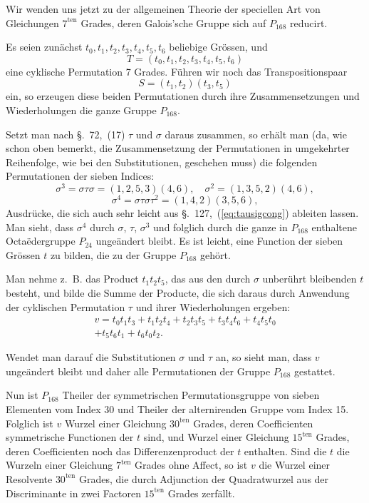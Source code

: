 \documentclass[12pt,a4paper]{article}
\begin{document}
Wir wenden uns jetzt zu der allgemeinen Theorie der speciellen Art von Gleichungen $7^{\text{ten}}$ Grades, deren Galois'sche Gruppe sich auf $P_{168}$ reducirt.

Es seien zun\"achst $t_0, t_1, t_2, t_3, t_4, t_5, t_6$ beliebige Gr\"ossen, und
\begin{equation}
\label{eq:Tperm} T = (t_0, t_1, t_2, t_3, t_4, t_5, t_6)
\end{equation}
eine cyklische Permutation 7 Grades. F\"uhren wir noch das Transpositionspaar
\begin{equation}
\label{eq:Sperm} S = (t_1, t_2)(t_3, t_5)
\end{equation}
ein, so erzeugen diese beiden Permutationen durch ihre Zusammensetzungen und Wiederholungen die ganze Gruppe $P_{168}$.

Setzt man nach \S.~72,~(17) $\tau$ und $\sigma$ daraus zusammen, so erh\"alt man (da, wie schon oben bemerkt, die Zusammensetzung der Permutationen in umgekehrter Reihenfolge, wie bei den Substitutionen, geschehen muss) die folgenden Permutationen der sieben Indices:
\[\sigma^3 = \sigma\tau\sigma = (1, 2, 5, 3)(4, 6), \quad \sigma^2 = (1, 3, 5, 2)(4, 6),\]
\[\sigma^4 = \sigma\tau\sigma\tau^2 = (1, 4, 2)(3, 5, 6),\]
Ausdr\"ucke, die sich auch sehr leicht aus \S.~127,~(\ref{eq:tausigcong}) ableiten lassen. Man sieht, dass $\sigma^4$ durch $\sigma$, $\tau$, $\sigma^3$ und folglich durch die ganze in $P_{168}$ enthaltene Octa\"edergruppe $P_{24}$ unge\"andert bleibt. Es ist leicht, eine Function der sieben Gr\"ossen $t$ zu bilden, die zu der Gruppe $P_{168}$ geh\"ort.

Man nehme z.~B. das Product $t_1 t_2 t_5$, das aus den durch $\sigma$ unber\"uhrt bleibenden $t$ besteht, und bilde die Summe der Producte, die sich daraus durch Anwendung der cyklischen Permutation $\tau$ und ihrer Wiederholungen ergeben:
\begin{multline}
\label{eq:v} v = t_0 t_1 t_3 + t_1 t_2 t_4 + t_2 t_3 t_5 + t_3 t_4 t_6 + t_4 t_5 t_0\\ + t_5 t_6 t_1 + t_6 t_0 t_2.
\end{multline}

Wendet man darauf die Substitutionen $\sigma$ und $\tau$ an, so sieht man, dass $v$ unge\"andert bleibt und daher alle Permutationen der Gruppe $P_{168}$ gestattet.

Nun ist $P_{168}$ Theiler der symmetrischen Permutationsgruppe von sieben Elementen vom Index 30 und Theiler der alternirenden Gruppe vom Index 15. Folglich ist $v$ Wurzel einer Gleichung $30^{\text{ten}}$ Grades, deren Coefficienten symmetrische Functionen der $t$ sind, und Wurzel einer Gleichung $15^{\text{ten}}$ Grades, deren Coefficienten noch das Differenzenproduct der $t$ enthalten. Sind die $t$ die Wurzeln einer Gleichung $7^{\text{ten}}$ Grades ohne Affect, so ist $v$ die Wurzel einer Resolvente $30^{\text{ten}}$ Grades, die durch Adjunction der Quadratwurzel aus der Discriminante in zwei Factoren $15^{\text{ten}}$ Grades zerf\"allt.
\end{document}

